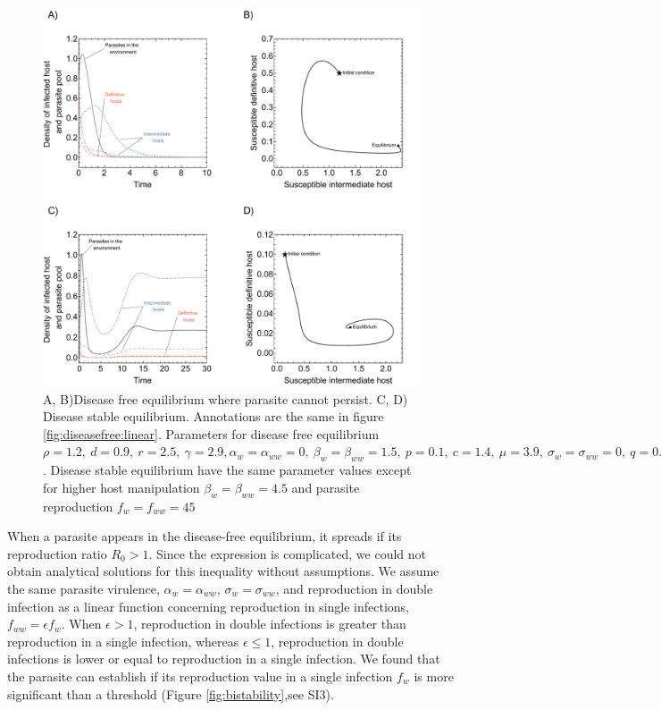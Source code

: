 \documentclass[11pt]{article}
\begin{document}
\begin{figure}[!ht]
\includegraphics[width=\textwidth]{Figures/ecotraject_nonlinear.pdf}
\caption{A, B)Disease free equilibrium where parasite cannot persist. C, D) Disease stable equilibrium. Annotations are the same in figure \ref{fig:diseasefree:linear}. Parameters for disease free equilibrium $\rho =  1.2, \ d = 0.9, \  r = 2.5, \ \gamma =  2.9, \alpha_w = \alpha_{ww} =  0, \ \beta_w = \beta_{ww} = 1.5, \ p = 0.1, \  c = 1.4, \ \mu = 3.9, \ \sigma_w = \sigma_{ww} = 0, \ q = 0.01, \ f_w = f_{ww} = 7.5, \ \delta = 0.9, \ k = 0.26$. Disease stable equilibrium have the same parameter values except for higher host manipulation $ \beta_w =  \beta_{ww} = 4.5$ and parasite reproduction $ f_w  = f_{ww} = 45$}
\label{fig:ecotraject:nonlinear}
\end{figure}

When a parasite appears in the disease-free equilibrium, it spreads if its reproduction ratio $R_0 > 1$. 
Since the expression is complicated, we could not obtain analytical solutions for this inequality without assumptions. 
We assume the same parasite virulence, $\alpha_w = \alpha_{ww}$, $\sigma_w = \sigma_{ww}$, and reproduction in double infection as a linear function concerning reproduction in single infections, $f_{ww} = \epsilon f_w$. 
When $\epsilon > 1$, reproduction in double infections is greater than reproduction in a single infection, whereas $\epsilon \leq 1$, reproduction in double infections is lower or equal to reproduction in a single infection.
We found that the parasite can establish if its reproduction value in a single infection $f_w$ is more significant than a threshold (Figure \ref{fig:bistability},see SI3). 
\end{document}
